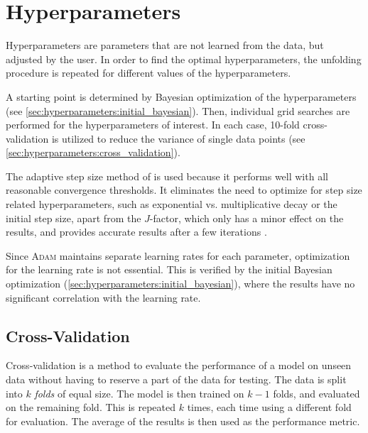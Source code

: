 \clearpage %
\section{Hyperparameters}
Hyperparameters are parameters that are not learned from the data,
but adjusted by the user.
%
In order to find the optimal hyperparameters,
the unfolding procedure is repeated for different values of the hyperparameters.


A starting point is determined by Bayesian optimization of the hyperparameters
  (see \autoref{sec:hyperparameters:initial_bayesian}).
Then, individual grid searches are performed for the hyperparameters of interest.
%
In each case, 10-fold cross-validation is utilized to reduce the variance of single data points
  (see \autoref{sec:hyperparameters:cross_validation}).

The adaptive step size method of \dseaplus{} is used
because it performs well with all reasonable convergence thresholds.
It eliminates the need to optimize for step size related hyperparameters,
  such as
    exponential vs. multiplicative decay
    or the initial step size,
  apart from the $J$-factor,
    which only has a minor effect on the results,
and provides accurate results after a few iterations \cite{dsea_mirko}.

Since \textsc{Adam} maintains separate learning rates for each parameter,
optimization for the learning rate is not essential.
This is verified by the initial Bayesian optimization (\autoref{sec:hyperparameters:initial_bayesian}),
  where the results have no significant correlation with the learning rate.


\subsection{Cross-Validation} \label{sec:hyperparameters:cross_validation}
Cross-validation \cite{cross_validation} is a method to evaluate the performance of a model on unseen data
without having to reserve a part of the data for testing.
%
The data is split into $k$ \emph{folds} of equal size. %
The model is then trained on $k-1$ folds,
and evaluated on the remaining fold.
This is repeated $k$ times,
each time using a different fold for evaluation.
The average of the results is then used as the performance metric.

